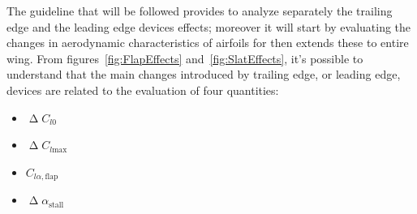 \bigskip
\noindent
The guideline that will be followed provides to analyze separately the trailing edge and the leading edge devices effects; moreover it will start by evaluating the changes in aerodynamic characteristics of airfoils for then extends these to entire wing.
%
From figures~\ref{fig:FlapEffects} and~\ref{fig:SlatEffects}, it's possible to understand that the main changes introduced by trailing edge, or leading edge, devices are related to the evaluation of four quantities:
%
\begin{itemize}
\item $\upDelta C_{l0}$
\item $\upDelta C_{l\text{max}}$
\item $C_{l\alpha, \text{flap}}$
\item $\upDelta\alpha_{\text{stall}}$
\end{itemize}
%
